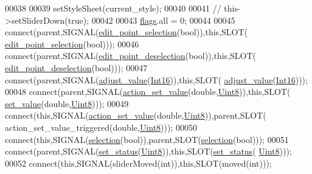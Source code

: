 \begin{DoxyCode}
00038 
00039      setStyleSheet(current\_style);
00040 
00041     \textcolor{comment}{// this->setSliderDown(true);}
00042 
00043     \hyperlink{a00024_ade6449558d429b66e5ed1381bc9b9060}{flags}.all = 0;
00044 
00045     connect(parent,SIGNAL(\hyperlink{a00024_adeebaace74ff3add2acd9147e96fc0a6}{edit\_point\_selection}(\textcolor{keywordtype}{bool})),\textcolor{keyword}{this},SLOT(
      \hyperlink{a00024_adeebaace74ff3add2acd9147e96fc0a6}{edit\_point\_selection}(\textcolor{keywordtype}{bool})));
00046     connect(parent,SIGNAL(\hyperlink{a00024_a105dff1f3ae7cfdcfabacd013428a501}{edit\_point\_deselection}(\textcolor{keywordtype}{bool})),\textcolor{keyword}{this},SLOT(
      \hyperlink{a00024_a105dff1f3ae7cfdcfabacd013428a501}{edit\_point\_deselection}(\textcolor{keywordtype}{bool})));
00047     connect(parent,SIGNAL(\hyperlink{a00024_a521ac5143857dd652a0bafa77389fa81}{adjust\_value}(\hyperlink{a00001_a3985266aecb120f269789241c170850c}{Int16})),\textcolor{keyword}{this},SLOT(
      \hyperlink{a00024_a521ac5143857dd652a0bafa77389fa81}{adjust\_value}(\hyperlink{a00001_a3985266aecb120f269789241c170850c}{Int16})));
00048     connect(parent,SIGNAL(\hyperlink{a00024_a886f07f2c612121bec703581f9398a10}{action\_set\_value}(\textcolor{keywordtype}{double},\hyperlink{a00001_a979e3e23b9a449e69ab6a8a83b6042f8}{Uint8})),\textcolor{keyword}{this},SLOT(
      \hyperlink{a00024_ae3010d3de02715db2f443560d7d2a27b}{set\_value}(\textcolor{keywordtype}{double},\hyperlink{a00001_a979e3e23b9a449e69ab6a8a83b6042f8}{Uint8})));
00049     connect(\textcolor{keyword}{this},SIGNAL(\hyperlink{a00024_a886f07f2c612121bec703581f9398a10}{action\_set\_value}(\textcolor{keywordtype}{double},\hyperlink{a00001_a979e3e23b9a449e69ab6a8a83b6042f8}{Uint8})),parent,SLOT(
      action\_set\_value\_triggered(\textcolor{keywordtype}{double},\hyperlink{a00001_a979e3e23b9a449e69ab6a8a83b6042f8}{Uint8})));
00050     connect(\textcolor{keyword}{this},SIGNAL(\hyperlink{a00024_a66bf875d43a16cf37527ab75c439fd8e}{selection}(\textcolor{keywordtype}{bool})),parent,SLOT(\hyperlink{a00024_a66bf875d43a16cf37527ab75c439fd8e}{selection}(\textcolor{keywordtype}{bool})));
00051     connect(parent,SIGNAL(\hyperlink{a00024_a567902754e43310fe921b74c9d1862dd}{set\_status}(\hyperlink{a00001_a979e3e23b9a449e69ab6a8a83b6042f8}{Uint8})),\textcolor{keyword}{this},SLOT(\hyperlink{a00024_a567902754e43310fe921b74c9d1862dd}{set\_status}(
      \hyperlink{a00001_a979e3e23b9a449e69ab6a8a83b6042f8}{Uint8})));
00052     connect(\textcolor{keyword}{this},SIGNAL(sliderMoved(\textcolor{keywordtype}{int})),\textcolor{keyword}{this},SLOT(moved(\textcolor{keywordtype}{int})));

\end{DoxyCode}
